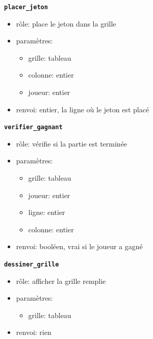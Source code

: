 \documentclass[svgnames,11pt]{beamer}
\begin{document}
\begin{frame}

    {\Large \textbf{\texttt{placer\_jeton}}}
    \begin{itemize}
        \item rôle: place le jeton dans la grille
        \item paramètres:
        \begin{itemize}
            \item grille: tableau
            \item colonne: entier
            \item joueur: entier
        \end{itemize}
        \item renvoi: entier, la ligne où le jeton est placé
    \end{itemize}

\end{frame}
\begin{frame}

    {\Large \textbf{\texttt{verifier\_gagnant}}}
    \begin{itemize}
        \item rôle: vérifie si la partie est terminée 
        \item paramètres:
        \begin{itemize}
            \item grille: tableau
            \item joueur: entier
            \item ligne: entier
            \item colonne: entier
        \end{itemize}
        \item renvoi: booléen, vrai si le joueur a gagné
    \end{itemize}

\end{frame}
\begin{frame}

    {\Large \textbf{\texttt{dessiner\_grille}}}
    \begin{itemize}
        \item rôle: afficher la grille remplie
        \item paramètres:
        \begin{itemize}
            \item grille: tableau
        \end{itemize}
        \item renvoi: rien
    \end{itemize}

\end{frame}
\end{document}

